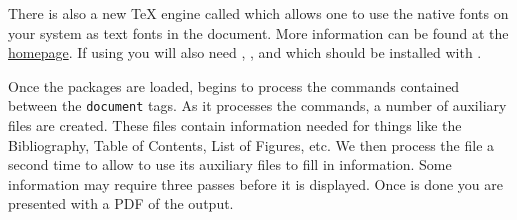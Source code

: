 There is also a new \TeX{} engine called \xt which allows one to use the native fonts on your system as text fonts in the document. More information can be found at the \href{http://scripts.sil.org/cms/scripts/page.php?site_id=nrsi&id=xetex}{\xt homepage}. If using \xt you will also need , , and  which should be installed with \xt.

Once the packages are loaded, \lt begins to process the commands contained between the \texttt{document} tags. As it processes the commands, a number of auxiliary files are created. These files contain information needed for things like the Bibliography, Table of Contents, List of Figures, etc. We then process the file a second time to allow \lt to use its auxiliary files to fill in information. Some information may require three passes before it is displayed. Once \lt is done you are presented with a PDF of the output.